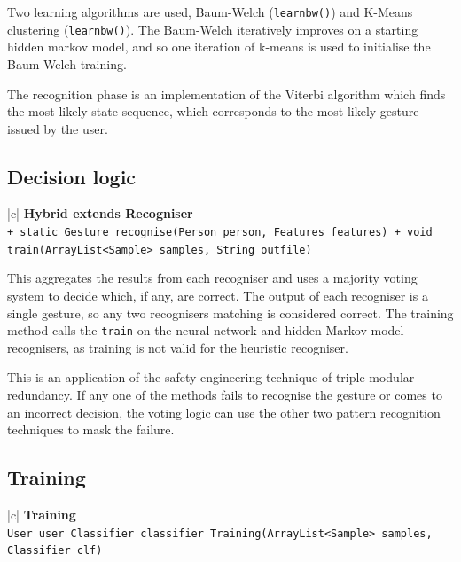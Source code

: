 \documentclass[12pt,a4,notitlepage]{report}
\renewcommand{\_}{\texttt{\symbol{95}}}
\newcommand{\<}{\texttt{\symbol{60}}}
\renewcommand{\>}{\texttt{\symbol{62}}}
\newcommand{\class}[1]{\textbf{#1}}
\newcommand{\variable}[1]{\texttt{#1}}
\begin{document}
Two learning algorithms are used, Baum-Welch (\variable{learnbw()}) and K-Means clustering (\variable{learnbw()}). The Baum-Welch iteratively improves on a starting hidden markov model, and so one iteration of k-means is used to initialise the Baum-Welch training.

The recognition phase is an implementation of the Viterbi algorithm which finds the most likely state sequence, which corresponds to the most likely gesture issued by the user.

\newpage

\subsection{Decision logic}

\begin{tabular}{|c|} \hline 
\class{Hybrid extends Recogniser} \\ \hline
{}
{ \variable{+ static Gesture recognise(Person person, Features features) \newline
+ void train(ArrayList<Sample> samples, String out\_file)
} } \\ \hline
\end{tabular}

This aggregates the results from each recogniser and uses a majority voting system to decide which, if any, are correct. The output of each recogniser is a single gesture, so any two recognisers matching is considered correct. The training method calls the \variable{train} on the neural network and hidden Markov model recognisers, as training is not valid for the heuristic recogniser.

This is an application of the safety engineering technique of triple modular redundancy. If any one of the methods fails to recognise the gesture or comes to an incorrect decision, the voting logic can use the other two pattern recognition techniques to mask the failure.

\subsection{Training}

\begin{tabular}{|c|} \hline 
\class{Training} \\ \hline
{}
{\variable{User user \newline
Classifier classifier \newline
Training(ArrayList<Sample> samples, Classifier clf)
} } \\ \hline
\end{tabular}
\end{document}
